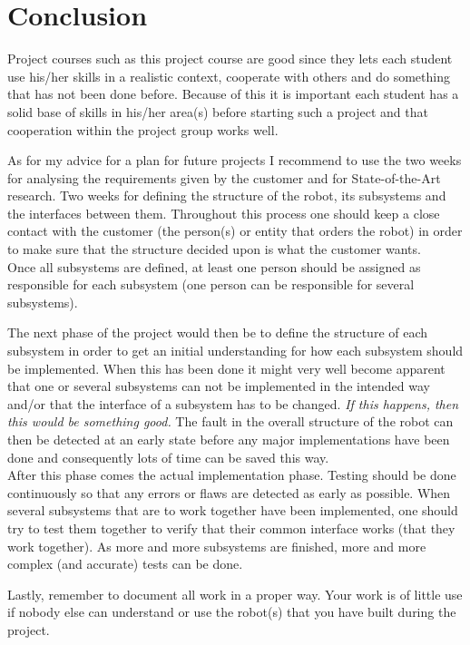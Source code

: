 \section{Conclusion}\label{sec:conclusion}
Project courses such as this project course are good since they lets each student use his/her skills in a realistic context, cooperate with others and do something that has not been done before. Because of this it is important each student has a solid base of skills in his/her area(s) before starting such a project and that cooperation within the project group works well.

As for my advice for a plan for future projects I recommend to use the two weeks for analysing the requirements given by the customer and for State-of-the-Art research. Two weeks for defining the structure of the robot, its subsystems and the interfaces between them. Throughout this process one should keep a close contact with the customer (the person(s) or entity that orders the robot) in order to make sure that the structure decided upon is what the customer wants. \\
Once all subsystems are defined, at least one person should be assigned as responsible for each subsystem (one person can be responsible for several subsystems).

The next phase of the project would then be to define the structure of each subsystem in order to get an initial understanding for how each subsystem should be implemented. When this has been done it might very well become apparent that one or several subsystems can not be implemented in the intended way and/or that the interface of a subsystem has to be changed.\emph{ If this happens, then this would be something good.} The fault in the overall structure of the robot can then be detected at an early state before any major implementations have been done and consequently lots of time can be saved this way. \\
After this phase comes the actual implementation phase. Testing should be done continuously so that any errors or flaws are detected as early as possible. When several subsystems that are to work together have been implemented, one should try to test them together to verify that their common interface works (that they work together). As more and more subsystems are finished, more and more complex (and accurate) tests can be done.

Lastly, remember to document all work in a proper way. Your work is of little use if nobody else can understand or use the robot(s) that you have built during the project.